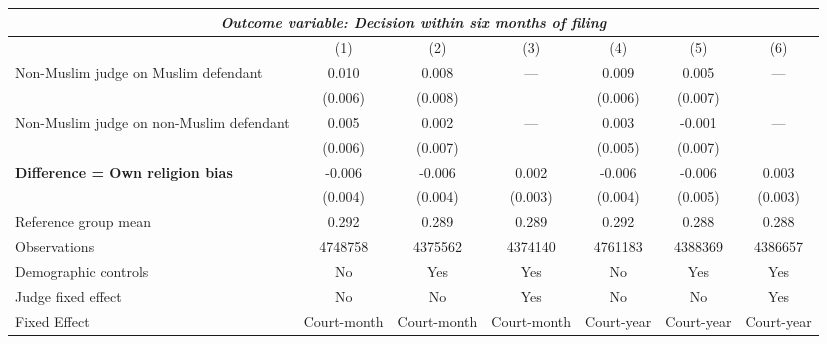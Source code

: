 {
\def\sym#1{\ifmmode^{#1}\else\(^{#1}\)\fi}
\begin{tabular}{l*{6}{c}}
  \hline\hline
\multicolumn{7}{c}{\textit{Outcome variable: Decision within six months of filing}}\\
\hline
&\multicolumn{1}{c}{(1)}&\multicolumn{1}{c}{(2)}&\multicolumn{1}{c}{(3)}&\multicolumn{1}{c}{(4)}&\multicolumn{1}{c}{(5)}&\multicolumn{1}{c}{(6)}\\
\hline
Non-Muslim judge on Muslim defendant \hspace{15mm}& 0.010 & 0.008 & --- & 0.009 & 0.005 & --- \\
& (0.006) & (0.008) &  & (0.006) &(0.007) &  \\
Non-Muslim judge on non-Muslim defendant \hspace{15mm}& 0.005 & 0.002 & ---& 0.003 & -0.001 & --- \\
& (0.006) & (0.007) &  & (0.005) & (0.007) &  \\
\textbf{Difference = Own religion bias} & -0.006 & -0.006 & 0.002 & -0.006 & -0.006 & 0.003 \\
& (0.004) & (0.004) & (0.003) & (0.004) & (0.005) & (0.003) \\
\hline
Reference group mean & 0.292 & 0.289 & 0.289 & 0.292 & 0.288 & 0.288 \\
Observations & 4748758 & 4375562 & 4374140 & 4761183 & 4388369 & 4386657 \\
Demographic controls & No & Yes & Yes & No & Yes & Yes \\
Judge fixed effect & No & No & Yes & No & No & Yes \\
Fixed Effect & Court-month & Court-month & Court-month & Court-year & Court-year & Court-year \\
\hline\hline
\end{tabular}
}
 
